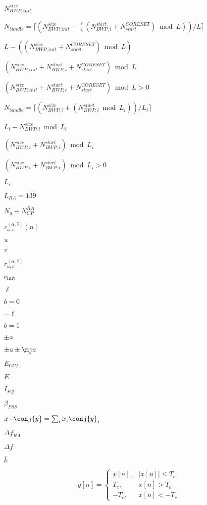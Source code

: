 \documentclass{article}
\begin{document}
$N_{BWP,init}^{size}$
\pagebreak

$N_{bundle}=\lceil (N_{BWP,init}^{size} + ((N_{BWP,i}^{start} + N_{start}^{CORESET}) \bmod L))/L
\rceil$
\pagebreak

$L - ((N_{BWP,init}^{size} + N_{start}^{CORESET}) \bmod L)$
\pagebreak

$(N_{BWP,init}^{size} + N_{BWP,i}^{start} + N_{start}^{CORESET}) \bmod L$
\pagebreak

$(N_{BWP,init}^{size} + N_{BWP,i}^{start} + N_{start}^{CORESET}) \bmod L > 0$
\pagebreak

$N_{bundle}=\lceil (N_{BWP,i}^{size} + (N_{BWP,i}^{start} \bmod L_i))/L_i \rceil$
\pagebreak

$L_i - N_{BWP,i}^{size} \bmod L_i$
\pagebreak

$(N_{BWP,i}^{size}+N_{BWP,i}^{start}) \bmod L_i$
\pagebreak

$(N_{BWP,i}^{size}+N_{BWP,i}^{start}) \bmod L_i > 0$
\pagebreak

$L_i$
\pagebreak

$L_{RA}=139$
\pagebreak

$N_u+N_{CP}^{RA}$
\pagebreak

$r^{(\alpha, \delta)}_{u,v}(n)$
\pagebreak

$u$
\pagebreak

$v$
\pagebreak

$r^{(\alpha, \delta)}_{u,v}$
\pagebreak

$c_{\textup{init}}$
\pagebreak

$\ell$
\pagebreak

$b = 0$
\pagebreak

$-\ell$
\pagebreak

$b = 1$
\pagebreak

$\pm a$
\pagebreak

$\pm a \pm \mj a$
\pagebreak

$E_{UCI}$
\pagebreak

$E$
\pagebreak

$I_{seg}$
\pagebreak

$\beta_{PSS}$
\pagebreak

$ x \cdot \conj{y}= \sum_i x_i \conj{y}_i $
\pagebreak

$\Delta f_{RA}$
\pagebreak

$\Delta f$
\pagebreak

$\bar{k}$
\pagebreak

\[
y[n] =
\begin{cases}
x[n],&  \lvert x[n] \rvert  \leq T_c \\ T_c,& x[n] > T_c \\ -T_c,& x[n] < -T_c
\end{cases}
\]
\pagebreak
\end{document}
